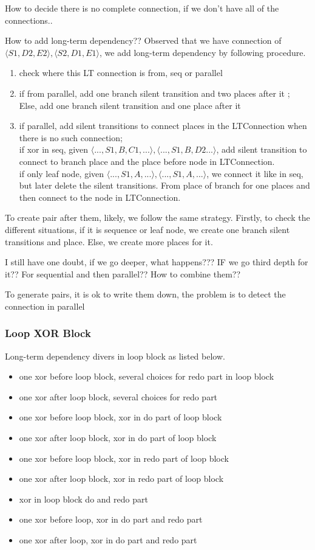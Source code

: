 \documentclass[]{article}
\begin{document}
How to decide there is no complete connection, if we don't have all of the connections.. 

How to add long-term dependency?? Observed that we have connection of $\langle S1,D2,E2 \rangle, \langle S2,D1,E1 \rangle $, we add long-term dependency by following procedure. 
\begin{enumerate}
	\item check where this LT connection is from, seq or parallel
	\item if from parallel, add one branch silent transition and two places after it ; \\
	Else, add one branch silent transition and one place after it
	\item if parallel, add silent transitions to connect places in the LTConnection when there is no such connection;\\
	if xor in seq, given $\langle ..., S1,B,C1,... \rangle, \langle ...,S1,B,D2... \rangle $, add silent transition to connect to branch place and the place before node in LTConnection. \\
	if only leaf node, given  $\langle ..., S1,A,... \rangle, \langle ...,S1,A,... \rangle $, we connect it like in seq, but later delete the silent transitions. From place of branch for one places and then connect to the node in LTConnection. 
\end{enumerate}
To create pair after them, likely, we follow the same strategy. Firstly, to check the different situations, if it is sequence or leaf node, we create one branch silent transitions and place. Else, we create more places for it. 

I still have one doubt, if we go deeper, what happens??? IF we go third depth for it?? For sequential and then parallel?? How to combine them??

To generate pairs, it is ok to write them down, the problem is to detect the connection in parallel

\subsubsection{Loop XOR Block}
Long-term dependency divers in loop block as listed below. 
\begin{itemize}
	\item one xor before loop block, several choices for redo part in loop block
	\item one xor after loop block, several choices for redo part
	\item one xor before loop block, xor in do part of loop block
	\item one xor after loop block, xor in do part of loop block
	\item one xor before loop block, xor in redo part of loop block
	\item one xor after loop block, xor in redo part of loop block
	\item xor in loop block do and redo part
	\item one xor before loop, xor in do part and redo part
	\item one xor after loop, xor in do part and redo part
\end{itemize}
\end{document}
